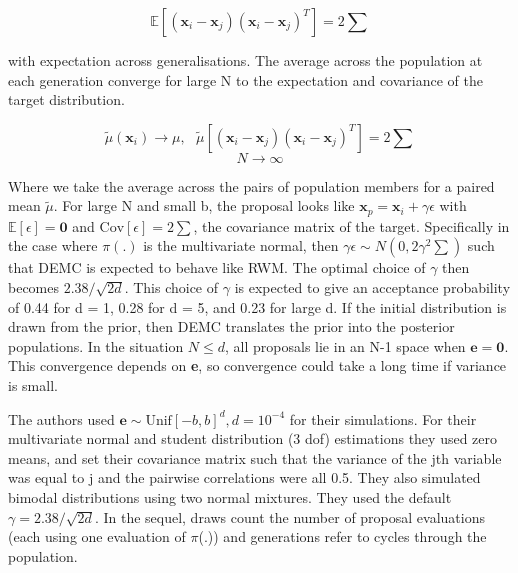 \documentclass[a4paper]{article}
\begin{document}
\[\mathbb{E}\left[(\mathbf{x}_i - \mathbf{x}_j)(\mathbf{x}_i - \mathbf{x}_j)^T \right] = 2 \sum\]

with expectation across generalisations. The average across the population at each generation converge for large N to the expectation and covariance of the target distribution.

\[\tilde{\mu}(\mathbf{x}_i) \rightarrow \mu, \text{ } \tilde{\mu} \left[ (\mathbf{x}_i - \mathbf{x}_j)(\mathbf{x}_i - \mathbf{x}_j)^T \right] = 2 \sum \]
\[N \rightarrow \infty \]

Where we take the average across the pairs of population members for a paired mean \(\tilde{\mu}\). For large N and small b, the proposal looks like \(\mathbf{x}_p = \mathbf{x}_i + \gamma \epsilon\) with \(\mathbb{E} [\epsilon] = \mathbf{0}\) and \(\text{Cov} [\epsilon] = 2 \sum\), the covariance matrix of the target. Specifically in the case where \(\pi(.)\) is the multivariate normal, then \(\gamma \epsilon \sim N(0, 2 \gamma^2 \sum)\) such that DEMC is expected to behave like RWM. The optimal choice of \(\gamma\) then becomes \(2.38 / \sqrt{2d}\). This choice of \(\gamma\) is expected to give an acceptance probability of 0.44 for d = 1, 0.28 for d = 5, and 0.23 for large d. If the initial distribution is drawn from the prior, then DEMC translates the prior into the posterior populations. In the situation \(N \leq d\), all proposals lie in an N-1 space when \(\mathbf{e} = \mathbf{0}\). This convergence depends on \textbf{e}, so convergence could take a long time if variance is small.

The authors used \(\mathbf{e} \sim \text{Unif} [-b, b]^d, d = 10^{-4}\) for their simulations. For their multivariate normal and student distribution (3 dof) estimations they used zero means, and set their covariance matrix such that the variance of the jth variable was equal to j and the pairwise correlations were all 0.5. They also simulated bimodal distributions using two normal mixtures. They used the default \(\gamma = 2.38 / \sqrt{2d}\). In the sequel, draws count the number of proposal evaluations (each using one evaluation of \(\pi\)(.)) and generations refer to cycles through the population.
\end{document}
